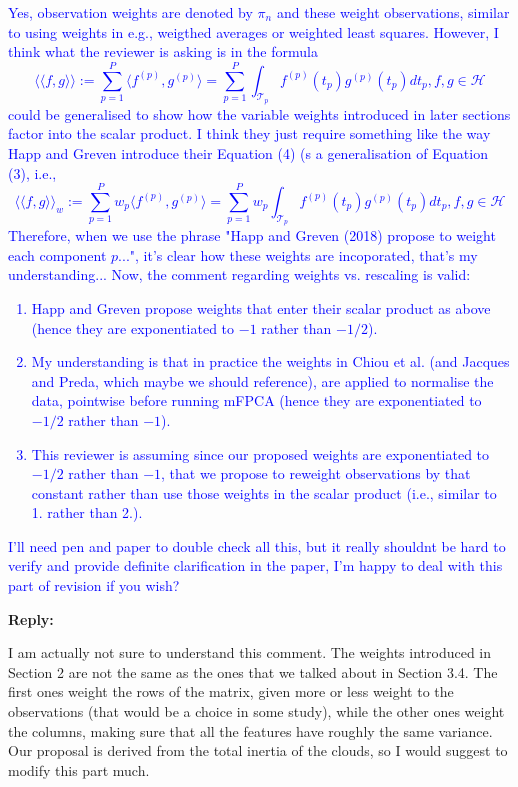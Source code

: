 \documentclass[11pt]{article}
\begin{document}
\textcolor{blue}{
Yes, observation weights are denoted by $\pi_n$ and these weight observations, similar to using weights in e.g., weigthed averages or weighted least squares. However, I think what the reviewer is asking is in the formula
$$\langle\langle f,g \rangle\rangle := \sum_{p=1}^P \langle f^{(p)},g^{(p)}\rangle = \sum_{p=1}^P \int_{\mathcal{T}_p}  f^{(p)}(t_p)g^{(p)}(t_p)dt_p, f,g \in \mathcal{H}$$
could be generalised to show how the variable weights introduced in later sections factor into the scalar product. I think they just require something like the way Happ and Greven introduce their Equation (4) (s a generalisation of Equation (3), i.e.,
$$\langle\langle f,g \rangle\rangle_w := \sum_{p=1}^P w_p \langle f^{(p)},g^{(p)}\rangle = \sum_{p=1}^P w_p \int_{\mathcal{T}_p}  f^{(p)}(t_p)g^{(p)}(t_p)dt_p, f,g \in \mathcal{H}$$
Therefore, when we use the phrase "Happ and Greven (2018) propose to weight each component $p$...", it's clear how these weights are incoporated, that’s my understanding... Now, the comment regarding weights vs. rescaling is valid:
\begin{enumerate}
  \item Happ and Greven propose weights that enter their scalar product as above (hence they are exponentiated to $-1$ rather than $-1/2$).
  \item My understanding is that in practice the weights in Chiou et al. (and Jacques and Preda, which maybe we should reference), are applied to normalise the data, pointwise before running mFPCA (hence they are exponentiated to $-1/2$ rather than $-1$).
  \item This reviewer is assuming since our proposed weights are exponentiated to $-1/2$ rather than $-1$, that we propose to reweight observations by that constant rather than use those weights in the scalar product (i.e., similar to 1. rather than 2.).
\end{enumerate}
I'll need pen and paper to double check all this, but it really shouldnt be hard to verify and provide definite clarification in the paper, I'm happy to deal with this part of revision if you wish?}


\medskip

\normalfont

\textbf{Reply:}

I am actually not sure to understand this comment. The weights introduced in Section 2 are not the same as the ones that we talked about in Section 3.4. The first ones weight the rows of the matrix, given more or less weight to the observations (that would be a choice in some study), while the other ones weight the columns, making sure that all the features have roughly the same variance. Our proposal is derived from the total inertia of the clouds, so I would suggest to modify this part much. 
\end{document}

